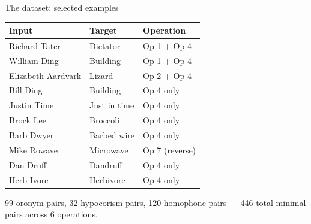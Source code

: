 \documentclass[10pt,aspectratio=169]{beamer}
\begin{document}
\begin{frame}{The dataset: selected examples}

\begin{center}
\renewcommand{\arraystretch}{1.3}
\begin{tabular}{lll}
\toprule
\textbf{Input} & \textbf{Target} & \textbf{Operation} \\
\midrule
Richard Tater & Dictator & Op 1 + Op 4 \\
William Ding & Building & Op 1 + Op 4 \\
Elizabeth Aardvark & Lizard & Op 2 + Op 4 \\
\midrule
Bill Ding & Building & Op 4 only \\
Justin Time & Just in time & Op 4 only \\
Brock Lee & Broccoli & Op 4 only \\
Barb Dwyer & Barbed wire & Op 4 only \\
\midrule
Mike Rowave & Microwave & Op 7 (reverse) \\
Dan Druff & Dandruff & Op 4 only \\
Herb Ivore & Herbivore & Op 4 only \\
\bottomrule
\end{tabular}
\end{center}

\vspace{0.3em}
{\small 99 oronym pairs, 32 hypocorism pairs, 120 homophone pairs --- 446 total minimal pairs across 6 operations.}
\end{frame}
\end{document}
